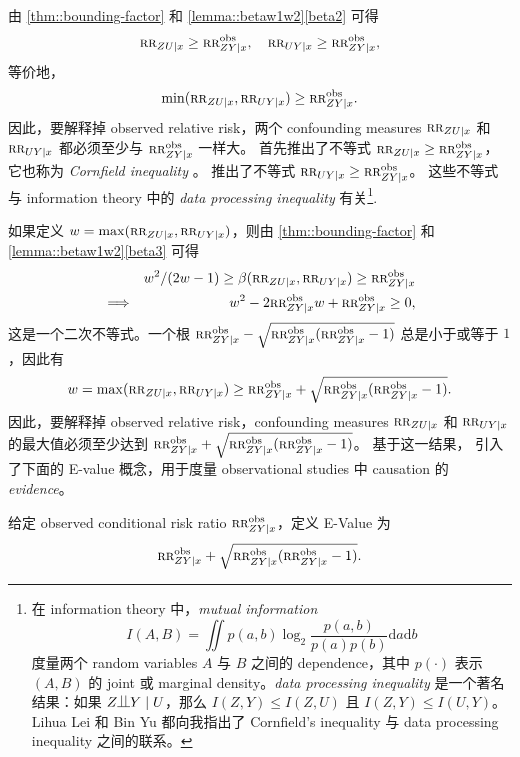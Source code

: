 由 \cref{thm::bounding-factor} 和 \cref{lemma::betaw1w2}\eqref{beta2} 可得
$$
 \textsc{rr}_{ZU\mid x} \geq \textsc{rr}_{ZY\mid x}^{\textup{obs}}, \quad  \textsc{rr}_{UY\mid x}  \geq \textsc{rr}_{ZY\mid x}^{\textup{obs}} , 
$$
等价地，
$$
\min( \textsc{rr}_{ZU\mid x} ,  \textsc{rr}_{UY\mid x} ) \geq \textsc{rr}_{ZY\mid x}^{\textup{obs}}.
$$
因此，要解释掉 observed relative risk，两个 confounding measures $\textsc{rr}_{ZU\mid x} $ 和 $  \textsc{rr}_{UY\mid x}$ 都必须至少与 $\textsc{rr}_{ZY\mid x}^{\textup{obs}}$ 一样大。
\citet{Cornfield::1959} 首先推出了不等式 $\textsc{rr}_{ZU\mid x} \geq \textsc{rr}_{ZY\mid x}^{\textup{obs}}$，它也称为 {\it Cornfield inequality} \citep{gastwirth1998cornfield}。\citet{Schlesselman::1978} 推出了不等式 $\textsc{rr}_{UY\mid x}  \geq \textsc{rr}_{ZY\mid x}^{\textup{obs}}$。
这些不等式与 information theory 中的 {\it data processing inequality} 有关\footnote{在 information theory 中，{\it mutual information}
$$
I(A,B) = \iint p(a,b) \log_2 \frac{  p(a,b) }{p(a)p(b)} \text{d} a \text{d} b
$$ 
度量两个 random variables $A$ 与 $B$ 之间的 dependence，其中 $p(\cdot)$ 表示 $(A,B)$ 的 joint 或 marginal density。{\it data processing inequality} 是一个著名结果：如果 $Z\ind Y \mid U$，那么 $I(Z,Y) \leq I(Z,U)$ 且 $I(Z,Y) \leq I(U,Y)$。
Lihua Lei 和 Bin Yu 都向我指出了 Cornfield's inequality 与 data processing inequality 之间的联系。
}. 



如果定义 $w = \max( \textsc{rr}_{ZU\mid x} ,  \textsc{rr}_{UY\mid x} )$，则由 \cref{thm::bounding-factor} 和 \cref{lemma::betaw1w2}\eqref{beta3} 可得
\begin{eqnarray*}
&&w^2/(2w-1) \geq \beta( \textsc{rr}_{ZU\mid x} , \textsc{rr}_{UY\mid x}) \geq \textsc{rr}_{ZY\mid x}^{\textup{obs}} \\ 
&\Longrightarrow & w^2 - 2 \textsc{rr}_{ZY\mid x}^{\textup{obs}} w + \textsc{rr}_{ZY\mid x}^{\textup{obs}} \geq 0,
\end{eqnarray*}
这是一个二次不等式。一个根 $  \textsc{rr}_{ZY\mid x}^{\textup{obs}} - \sqrt{ \textsc{rr}_{ZY\mid x}^{\textup{obs}} (\textsc{rr}_{ZY\mid x}^{\textup{obs}} - 1)} $ 总是小于或等于 $1$，因此有
$$
w = \max( \textsc{rr}_{ZU\mid x} ,  \textsc{rr}_{UY\mid x} ) \geq \textsc{rr}_{ZY\mid x}^{\textup{obs}} + \sqrt{ \textsc{rr}_{ZY\mid x}^{\textup{obs}} (\textsc{rr}_{ZY\mid x}^{\textup{obs}} - 1)} . 
$$
因此，要解释掉 observed relative risk，confounding measures $\textsc{rr}_{ZU\mid x} $ 和 $  \textsc{rr}_{UY\mid x}$ 的最大值必须至少达到 $\textsc{rr}_{ZY\mid x}^{\textup{obs}} + \sqrt{ \textsc{rr}_{ZY\mid x}^{\textup{obs}} (\textsc{rr}_{ZY\mid x}^{\textup{obs}} - 1)} $。
基于这一结果，\citet{vanderweele2017sensitivity} 引入了下面的 E-value 概念，用于度量 observational studies 中 causation 的 {\it evidence}。

 


\begin{definition}
[E-Value]
给定 observed conditional risk ratio $\textsc{rr}_{ZY\mid x}^{\textup{obs}}$，定义 E-Value 为
$$
\textsc{rr}_{ZY\mid x}^{\textup{obs}} + \sqrt{ \textsc{rr}_{ZY\mid x}^{\textup{obs}} (\textsc{rr}_{ZY\mid x}^{\textup{obs}} - 1)} . 
$$ 
\end{definition}

